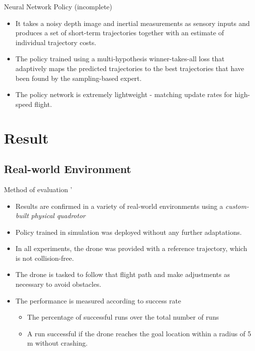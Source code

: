 \documentclass{beamer}
\begin{document}
\begin{frame}{Neural Network Policy (incomplete)}
	\begin{itemize}
		\item It takes a noisy depth image and inertial measurements as sensory inputs and produces a set of short-term trajectories together with an estimate of individual trajectory costs. 
		\item The policy trained using a multi-hypothesis winner-takes-all loss that adaptively maps the predicted trajectories to the best trajectories that have been found by the sampling-based expert. 
		\item The policy network is extremely lightweight - matching update rates for high-speed flight.
	\end{itemize}
	
	
\end{frame}

\section{Result}

\subsection{Real-world Environment}
\begin{frame}{Method of evaluation}
	'\begin{itemize}
		\item Results are confirmed in a variety of real-world environments using a \textit{custom-built physical quadrotor}
		\item Policy trained in simulation was deployed without any further adaptations.
		\item In all experiments, the drone was provided with a reference trajectory, which is not collision-free.
		\item The drone is tasked to follow that flight path and make adjustments as necessary to avoid obstacles.
		\item The performance is measured according to success rate
		\begin{itemize}
			\item The percentage of successful runs over the total number of runs
			\item A run successful if the drone reaches the goal location within a radius of 5 m without crashing.
		\end{itemize} 
	\end{itemize}
\end{frame}
\end{document}
